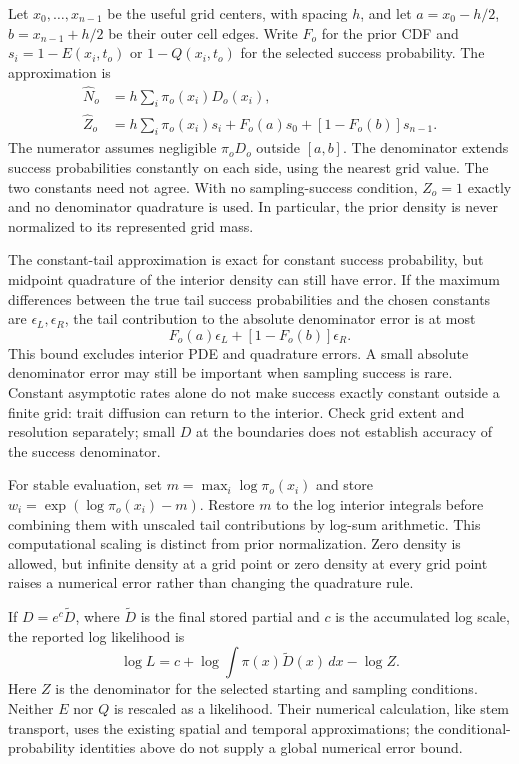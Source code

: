 \documentclass[11pt]{article}
\begin{document}
Let $x_0,\ldots,x_{n-1}$ be the useful grid centers, with spacing $h$, and let
$a=x_0-h/2$, $b=x_{n-1}+h/2$ be their outer cell edges. Write $F_o$ for the prior CDF and
$s_i=1-E(x_i,t_o)$ or $1-Q(x_i,t_o)$ for the selected success probability. The approximation is
\begin{align}
 \widehat N_o &= h\sum_i\pi_o(x_i)D_o(x_i),\\
 \widehat Z_o &= h\sum_i\pi_o(x_i)s_i
       +F_o(a)s_0+[1-F_o(b)]s_{n-1}.
\end{align}
The numerator assumes negligible $\pi_oD_o$ outside $[a,b]$. The denominator extends success
probabilities constantly on each side, using the nearest grid value. The two constants need not
agree. With no sampling-success condition, $Z_o=1$ exactly and no denominator quadrature is used.
In particular, the prior density is never normalized to its represented grid mass.

The constant-tail approximation is exact for constant success probability, but midpoint
quadrature of the interior density can still have error. If the maximum differences between the
true tail success probabilities and the chosen constants are $\epsilon_L,\epsilon_R$, the tail
contribution to the absolute denominator error is at most
\[
 F_o(a)\epsilon_L+[1-F_o(b)]\epsilon_R.
\]
This bound excludes interior PDE and quadrature errors. A small absolute denominator error may
still be important when sampling success is rare. Constant asymptotic rates alone do not make
success exactly constant outside a finite grid: trait diffusion can return to the interior.
Check grid extent and resolution separately; small $D$ at the boundaries does not establish
accuracy of the success denominator.

For stable evaluation, set $m=\max_i\log\pi_o(x_i)$ and store
$w_i=\exp(\log\pi_o(x_i)-m)$. Restore $m$ to the log interior integrals before combining them
with unscaled tail contributions by log-sum arithmetic. This computational scaling is distinct
from prior normalization. Zero density is allowed, but infinite density at a grid point or zero
density at every grid point raises a numerical error rather than changing the quadrature rule.

If $D=e^c\widetilde D$, where $\widetilde D$ is the final stored partial and $c$ is the
accumulated log scale, the reported log likelihood is
\[
 \log L=c+\log\int\pi(x)\widetilde D(x)\,dx-\log Z.
\]
Here $Z$ is the denominator for the selected starting and sampling conditions. Neither $E$ nor $Q$ is
rescaled as a likelihood. Their numerical calculation, like stem transport, uses the existing
spatial and temporal approximations; the conditional-probability identities above do not supply
a global numerical error bound.



\end{document}

